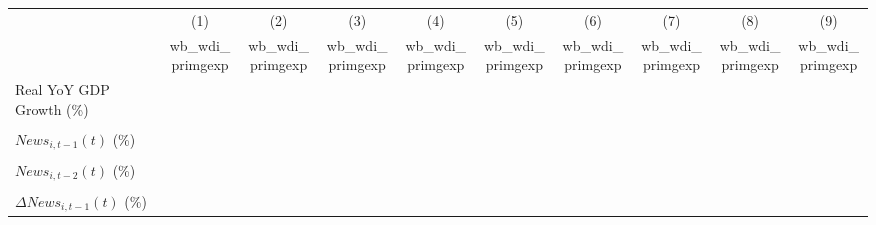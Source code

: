 {
\def\sym#1{\ifmmode^{#1}\else\(^{#1}\)\fi}
\begin{tabular}{l*{9}{c}}
\toprule
                    &\multicolumn{1}{c}{(1)}&\multicolumn{1}{c}{(2)}&\multicolumn{1}{c}{(3)}&\multicolumn{1}{c}{(4)}&\multicolumn{1}{c}{(5)}&\multicolumn{1}{c}{(6)}&\multicolumn{1}{c}{(7)}&\multicolumn{1}{c}{(8)}&\multicolumn{1}{c}{(9)}\\
                    &\multicolumn{1}{c}{wb_wdi_primgexp}&\multicolumn{1}{c}{wb_wdi_primgexp}&\multicolumn{1}{c}{wb_wdi_primgexp}&\multicolumn{1}{c}{wb_wdi_primgexp}&\multicolumn{1}{c}{wb_wdi_primgexp}&\multicolumn{1}{c}{wb_wdi_primgexp}&\multicolumn{1}{c}{wb_wdi_primgexp}&\multicolumn{1}{c}{wb_wdi_primgexp}&\multicolumn{1}{c}{wb_wdi_primgexp}\\
\midrule
Real YoY GDP Growth (\%)&                     &                     &                     &                     &                     &                     &                     &                     &                     \\
                    &                     &                     &                     &                     &                     &                     &                     &                     &                     \\
\addlinespace
$ News_{i,t-1}(t)$ (\%)&                     &                     &                     &                     &                     &                     &                     &                     &                     \\
                    &                     &                     &                     &                     &                     &                     &                     &                     &                     \\
\addlinespace
$ News_{i,t-2}(t)$ (\%)&                     &                     &                     &                     &                     &                     &                     &                     &                     \\
                    &                     &                     &                     &                     &                     &                     &                     &                     &                     \\
\addlinespace
$ \Delta News_{i,t-1}(t)$ (\%)&                     &                     &                     &                     &                     &                     &                     &                     &                     \\

\end{tabular}}

